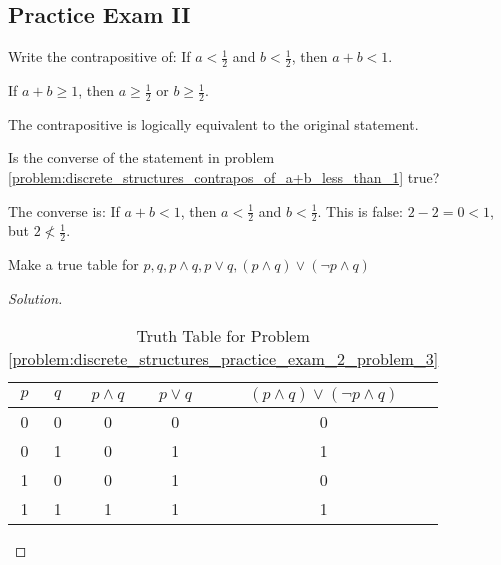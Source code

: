     \subsection{Practice Exam II}
    \begin{problem}
    \label{problem:discrete_structures_contrapos_of_a+b_less_than_1}
    Write the contrapositive of: If $a<\frac{1}{2}$ and $b< \frac{1}{2}$, then $a+b<1$. 
    \end{problem}
    \begin{solution}
        If $a+b \geq 1$, then $a\geq \frac{1}{2}$ or $b\geq \frac{1}{2}$.
    \end{solution}
    The contrapositive is logically equivalent to the original statement.
    \begin{problem}
        Is the converse of the statement in problem
        \ref{problem:discrete_structures_contrapos_of_a+b_less_than_1} true?
    \end{problem}
    \begin{solution}
        The converse is: If $a+b<1$, then $a<\frac{1}{2}$ and $b<\frac{1}{2}$.
        This is false: $2-2=0<1$, but $2\not<\frac{1}{2}$.
    \end{solution}
    \begin{problem}
    \label{problem:discrete_structures_practice_exam_2_problem_3}
    Make a true table for $p,q,p\land q, p\lor q, (p\land q)\lor (\neg p\land q)$
    \end{problem}
    \begin{proof}[Solution]
    \vspace{-\topsep}
    \
    \begin{table}[H]
        \centering
        \captionsetup{type=table}
        \begin{tabular}{c c c c c} 
            \hline
            $p$ & $q$ & $p\land q$ & $p\lor q$ & $(p\land q)\lor(\neg p\land q)$ \\ [0.5ex] 
            \hline
            0 & 0 & 0 & 0 & 0\\ 
            0 & 1 & 0 & 1 & 1\\
            1 & 0 & 0 & 1 & 0\\
            1 & 1 & 1 & 1 & 1\\
            \hline
        \end{tabular}
        \caption{Truth Table for Problem \ref{problem:discrete_structures_practice_exam_2_problem_3}}
        \label{tab:discrete_structures_practice_exam_2_problem_3}
    \end{table}
    \end{proof}
